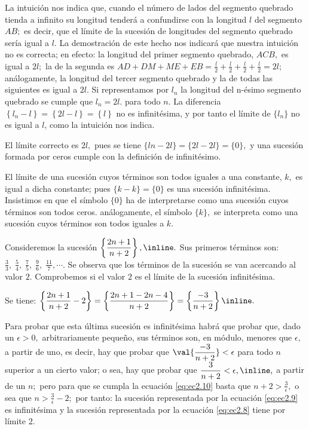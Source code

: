 \sol La intuición nos indica que, cuando el número de lados del segmento
quebrado tienda a infinito su longitud tenderá a confundirse con la
longitud $l$ del segmento $AB;$ es decir, que el límite de la sucesión
de longitudes del segmento quebrado sería igual a $l.$ La demostración
de este hecho nos indicará que nuestra intuición no es correcta; en
efecto: la longitud del primer segmento quebrado, $ACB,$ es igual
a $2l;$ la de la segunda es $AD+DM+ME+EB=\frac{l}{2}+\frac{l}{2}+\frac{l}{2}+\frac{l}{2}=2l;$
análogamente, la longitud del tercer segmento quebrado y la de todas
las siguientes es igual a $2l$. Si representamos por $l_{n}$ la
longitud del n-ésimo segmento quebrado se cumple que $l_{n}=2l.$
para todo $n.$ La diferencia $\left\{ l_{n}-l\right\} =\left\{ 2l-l\right\} =\left\{ l\right\} $
no es infinitésima, y por tanto el límite de $\{l_{n}\}$ no es igual
a $l$, como la intuición nos indica.

El límite correcto es $2l,$ pues se tiene $\{ln-2l\}=\{2l-2l\}=\{0\},$
y una sucesión formada por ceros cumple con la definición de infinitésimo.\fin 

\general El límite de una sucesión cuyos términos son todos iguales
a una constante, $k,$ es igual a dicha constante; pues $\{k-k\}=\{0\}$
es una sucesión infinitésima. Insistimos en que el símbolo $\{0\}$
ha de interpretarse como una sucesión cuyos términos son todos ceros.
análogamente, el símbolo $\{k\},$ se interpreta como una sucesión
cuyos términos son todos iguales a $k.$

\begin{ejemplo}\label{ej:ejem8cv}

Consideremos la sucesión $\left\{ \dfrac{2n+1}{n+2}\right\} ,\text{\inline\text{\label{eq:ec2.8}.}}$
Sus primeros términos son: $\frac{3}{3},\;\frac{5}{4},\;\frac{7}{5},\;\frac{9}{6},\;\frac{11}{7},\cdots.$
Se observa que los términos de la sucesión se van acercando al valor
$2.$ Comprobemos si el valor $2$ es el límite de la sucesión infinitésima.

Se tiene: $\left\{ \dfrac{2n+1}{n+2}-2\right\} =\left\{ \dfrac{2n+1-2n-4}{n+2}\right\} =\left\{ \dfrac{-3}{n+2}\right\} \text{\inline\text{\label{eq:ec2.9}.}}$

Para probar que esta última sucesión es infinitésima habrá que probar
que, dado un $\epsilon>0,$ arbitrariamente pequeño, sus términos
son, en módulo, menores que $\epsilon,$ a partir de uno, es decir,
hay que probar que $\val{\dfrac{-3}{n+2}}<\epsilon$ para todo $n$
superior a un cierto valor; o sea, hay que probar que $\dfrac{3}{n+2}<\epsilon,\text{\inline\text{\label{eq:ec2.10},}}$
a partir de un $n;$ pero para que se cumpla la ecuación \ref{eq:ec2.10}
basta que $n+2>\frac{3}{\epsilon},$ o sea que $n>\frac{3}{\epsilon}-2;$
por tanto: la sucesión representada por la ecuación \ref{eq:ec2.9}
es infinitésima y la sucesión representada por la ecuación \ref{eq:ec2.8}
tiene por límite 2.

\end{ejemplo}

